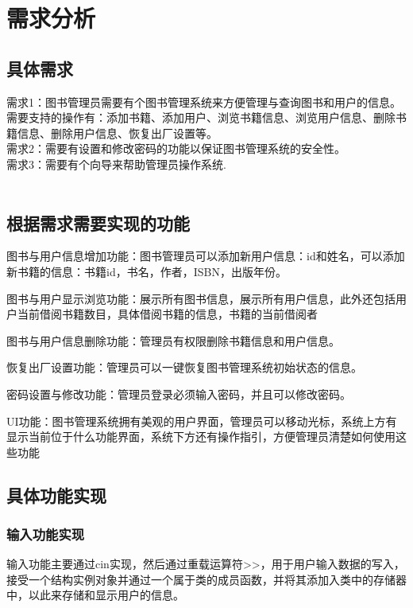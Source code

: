 \documentclass{article}
\begin{document}
\section{需求分析}

\subsection{具体需求}
\noindent
需求1：图书管理员需要有个图书管理系统来方便管理与查询图书和用户的信息。需要支持的操作有：添加书籍、添加用户、浏览书籍信息、浏览用户信息、删除书籍信息、删除用户信息、恢复出厂设置等。\\
需求2：需要有设置和修改密码的功能以保证图书管理系统的安全性。\\
需求3：需要有个向导来帮助管理员操作系统.\\\\

\subsection{根据需求需要实现的功能}
图书与用户信息增加功能：图书管理员可以添加新用户信息：id和姓名，可以添加新书籍的信息：书籍id，书名，作者，ISBN，出版年份。

图书与用户显示浏览功能：展示所有图书信息，展示所有用户信息，此外还包括用户当前借阅书籍数目，具体借阅书籍的信息，书籍的当前借阅者

图书与用户信息删除功能：管理员有权限删除书籍信息和用户信息。

恢复出厂设置功能：管理员可以一键恢复图书管理系统初始状态的信息。

密码设置与修改功能：管理员登录必须输入密码，并且可以修改密码。

UI功能：图书管理系统拥有美观的用户界面，管理员可以移动光标，系统上方有显示当前位于什么功能界面，系统下方还有操作指引，方便管理员清楚如何使用这些功能\\
\subsection{具体功能实现}
\subsubsection{输入功能实现}
输入功能主要通过cin实现，然后通过重载运算符>>，用于用户输入数据的写入，接受一个结构实例对象并通过一个属于类的成员函数，并将其添加入类中的存储器中，以此来存储和显示用户的信息。\\
\end{document}
